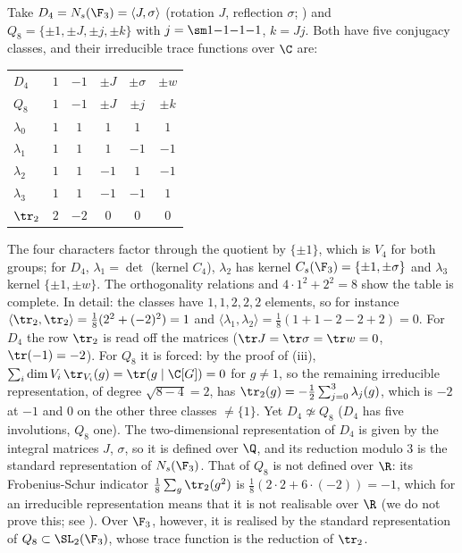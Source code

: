\begin{example}\label{ex:reps:tables}
Take $D_4=N_s(\F_3)=\langle J,\sigma\rangle$ (rotation $J$, reflection $\sigma$; ) and $Q_8=\{\pm1,\pm J,\pm j,\pm k\}$ with $j=\sm1{-1}{-1}{-1}$, $k=Jj$.
Both have five conjugacy classes, and their irreducible trace functions over $\C$ are:
\begin{center}
\begin{tabular}{lccccc}
\toprule
$D_4$ & $1$ & $-1$ & $\pm J$ & $\pm\sigma$ & $\pm w$\\
$Q_8$ & $1$ & $-1$ & $\pm J$ & $\pm j$ & $\pm k$\\
\midrule
$\lambda_0$ & $1$ & $1$ & $1$ & $1$ & $1$\\
$\lambda_1$ & $1$ & $1$ & $1$ & $-1$ & $-1$\\
$\lambda_2$ & $1$ & $1$ & $-1$ & $1$ & $-1$\\
$\lambda_3$ & $1$ & $1$ & $-1$ & $-1$ & $1$\\
$\tr_2$ & $2$ & $-2$ & $0$ & $0$ & $0$\\
\bottomrule
\end{tabular}
\end{center}
The four characters factor through the quotient by $\{\pm1\}$, which is $V_4$ for both groups; for $D_4$, $\lambda_1=\det$ (kernel $C_4$), $\lambda_2$ has kernel
$C_s(\F_3)=\{\pm1,\pm\sigma\}$ and $\lambda_3$ kernel $\{\pm1,\pm w\}$. The orthogonality relations and $4\cdot1^2+2^2=8$ show the table is complete. In detail: the classes have $1,1,2,2,2$
elements, so for instance $\langle\tr_2,\tr_2\rangle=\frac18(2^2+(-2)^2)=1$ and $\langle\lambda_1,\lambda_2\rangle=\frac18(1+1-2-2+2)=0$. For $D_4$ the row $\tr_2$ is read
off the matrices ($\tr J=\tr\sigma=\tr w=0$, $\tr(-1)=-2$). For $Q_8$ it is forced: by the proof of (iii),
$\sum_i\dim V_i\,\tr_{V_i}(g)=\tr(g\mid\C[G])=0$ for $g\ne1$, so the remaining irreducible representation, of degree $\sqrt{8-4}=2$, has
$\tr_2(g)=-\frac12\sum_{j=0}^3\lambda_j(g)$, which is $-2$ at $-1$ and $0$ on the other three classes $\ne\{1\}$. Yet
$D_4\not\simeq Q_8$ ($D_4$ has five involutions, $Q_8$ one). The two-dimensional representation of $D_4$ is given by the integral matrices $J$, $\sigma$,
so it is defined over $\Q$, and its reduction modulo $3$ is the standard representation of $N_s(\F_3)$. That of $Q_8$ is not defined over
$\R$: its Frobenius-Schur indicator $\frac18\sum_g\tr_2(g^2)$ is $\frac18(2\cdot2+6\cdot(-2))=-1$, which for an irreducible representation means that it
is not realisable over $\R$ (we do not prove this; see \cite[Section 13.2]{SerreLinearReps}). Over $\F_3$, however, it is realised by the
standard representation of $Q_8\subset\SL_2(\F_3)$, whose trace function is the reduction of $\tr_2$.
\end{example}

